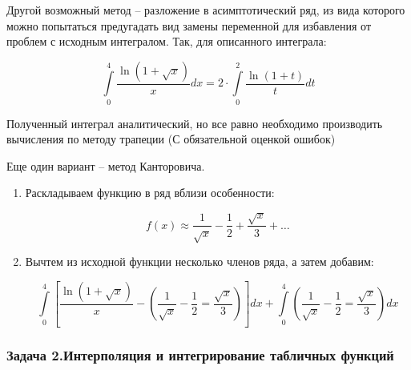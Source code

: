 \documentclass[10pt,a4paper]{article}
\begin{document}
	Другой возможный метод -- разложение в асимптотический ряд, из вида которого 
	можно попытаться предугадать вид замены переменной для избавления от проблем 
	с исходным интегралом. Так, для описанного интеграла:
	
	\begin{equation}
		\int\limits_{0}^{4} \frac{\ln\left(1 + \sqrt{x}\right)}{x}dx = 
		2\cdot\int\limits_{0}^{2} \frac{\ln\left(1 + t\right)}{t}dt
	\end{equation}
	
	Полученный интеграл аналитический, но все равно необходимо производить 
	вычисления по методу трапеции (С обязательной оценкой ошибок)
	
	Еще один вариант -- метод Канторовича.
	
	\begin{enumerate}
		\item Раскладываем функцию в ряд вблизи особенности:
		
		\begin{equation}
			f\left(x\right) \approx \frac{1}{\sqrt{x}} - \frac{1}{2}  + 
			\frac{\sqrt{x}}{3} + \ldots 
		\end{equation}
		
		\item Вычтем из исходной функции несколько членов ряда, а затем добавим:
		
		\begin{equation}
			\int\limits_{0}^{4}
			\left[ \frac{\ln\left(1 + \sqrt{x}\right)}{x} - 
			\left(\frac{1}{\sqrt{x}} - \frac{1}{2} = \frac{\sqrt{x}}{3}\right)
			\right]dx + \int\limits_{0}^{4} 
			\left(\frac{1}{\sqrt{x}} - \frac{1}{2} = \frac{\sqrt{x}}{3}\right)
			dx
		\end{equation}
	\end{enumerate}
	
	\subsubsection{Задача 2.Интерполяция и интегрирование табличных функций}
	
\end{document}
